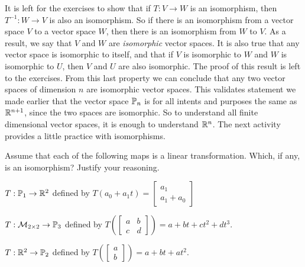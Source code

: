 It is left for the exercises to show that if $T: V \to W$ is an isomorphism, then $T^{-1}: W \to V$ is also an isomorphism. So if there is an isomorphism from a vector space $V$ to a vector space $W$, then there is an isomorphism from $W$ to $V$. As a result, we say that $V$ and $W$ are \emph{isomorphic} vector spaces. It is also true that any vector space is isomorphic to itself, and that if $V$ is isomorphic to $W$ and $W$ is isomorphic to $U$, then $V$ and $U$ are also isomorphic. The proof of this result is left to the exercises. From this last property we can conclude that any two vector spaces of dimension $n$ are isomorphic vector spaces. This validates statement we made earlier that the vector space $\mathbb{P}_n$ is for all intents and purposes the same as $\mathbb{R}^{n+1}$, since the two spaces are isomorphic. So to understand all finite dimensional vector spaces, it is enough to understand $\mathbb{R}^n$. The next activity provides a little practice with isomorphisms. 

\begin{activity} Assume that each of the following maps is a linear transformation. Which, if any, is an isomorphism? Justify your reasoning.
	\ba
	\item $T: \mathbb{P}_1 \to \mathbb{R}^2$ defined by $T(a_0+a_1t) = \left[ \begin{array}{c} a_1\\a_1+a_0 \end{array} \right]$
	\item $T: \mathcal{M}_{2 \times 2} \to \mathbb{P}_3$ defined by $T\left(\left[ \begin{array}{cc} a&b\\ c&d \end{array} \right] \right) = a+bt+ct^2+dt^3$. 
	\item $T: \mathbb{R}^2 \to \mathbb{P}_2$ defined by $T\left(\left[ \begin{array}{c} a\\ b \end{array} \right] \right) = a+bt+at^2$.
	\ea
	
\end{activity}



\label{sec:lin_trans_exam}

\ExampleIntro

